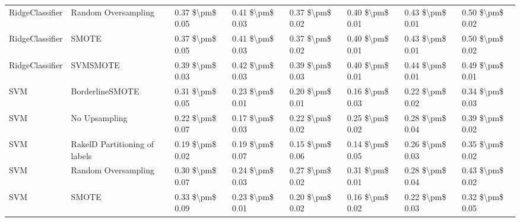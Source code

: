 \begin{tabular}{llllllll}
                RidgeClassifier &           Random Oversampling & 0.37 \$\textbackslash pm\$ 0.05 &           0.41 \$\textbackslash pm\$ 0.03 &       0.37 \$\textbackslash pm\$ 0.02 &        0.40 \$\textbackslash pm\$ 0.01 &                         0.43 \$\textbackslash pm\$ 0.01 &     0.50 \$\textbackslash pm\$ 0.02 \\
                RidgeClassifier &                         SMOTE & 0.37 \$\textbackslash pm\$ 0.05 &           0.41 \$\textbackslash pm\$ 0.03 &       0.37 \$\textbackslash pm\$ 0.02 &        0.40 \$\textbackslash pm\$ 0.01 &                         0.43 \$\textbackslash pm\$ 0.01 &     0.50 \$\textbackslash pm\$ 0.02 \\
                RidgeClassifier &                      SVMSMOTE & 0.39 \$\textbackslash pm\$ 0.03 &           0.42 \$\textbackslash pm\$ 0.03 &       0.39 \$\textbackslash pm\$ 0.03 &        0.40 \$\textbackslash pm\$ 0.01 &                         0.44 \$\textbackslash pm\$ 0.01 &     0.49 \$\textbackslash pm\$ 0.01 \\
                            SVM &               BorderlineSMOTE & 0.31 \$\textbackslash pm\$ 0.05 &           0.23 \$\textbackslash pm\$ 0.01 &       0.20 \$\textbackslash pm\$ 0.01 &        0.16 \$\textbackslash pm\$ 0.03 &                         0.22 \$\textbackslash pm\$ 0.02 &     0.34 \$\textbackslash pm\$ 0.03 \\
                            SVM &                 No Upsampling & 0.22 \$\textbackslash pm\$ 0.07 &           0.17 \$\textbackslash pm\$ 0.03 &       0.22 \$\textbackslash pm\$ 0.02 &        0.25 \$\textbackslash pm\$ 0.02 &                         0.28 \$\textbackslash pm\$ 0.04 &     0.39 \$\textbackslash pm\$ 0.02 \\
                            SVM & RakelD Partitioning of labels & 0.19 \$\textbackslash pm\$ 0.02 &           0.19 \$\textbackslash pm\$ 0.07 &       0.15 \$\textbackslash pm\$ 0.06 &        0.14 \$\textbackslash pm\$ 0.05 &                         0.26 \$\textbackslash pm\$ 0.03 &     0.35 \$\textbackslash pm\$ 0.02 \\
                            SVM &           Random Oversampling & 0.30 \$\textbackslash pm\$ 0.07 &           0.24 \$\textbackslash pm\$ 0.03 &       0.27 \$\textbackslash pm\$ 0.02 &        0.31 \$\textbackslash pm\$ 0.01 &                         0.28 \$\textbackslash pm\$ 0.04 &     0.43 \$\textbackslash pm\$ 0.02 \\
                            SVM &                         SMOTE & 0.33 \$\textbackslash pm\$ 0.09 &           0.23 \$\textbackslash pm\$ 0.01 &       0.20 \$\textbackslash pm\$ 0.02 &        0.16 \$\textbackslash pm\$ 0.02 &                         0.22 \$\textbackslash pm\$ 0.03 &     0.32 \$\textbackslash pm\$ 0.05 \\

\end{tabular}
